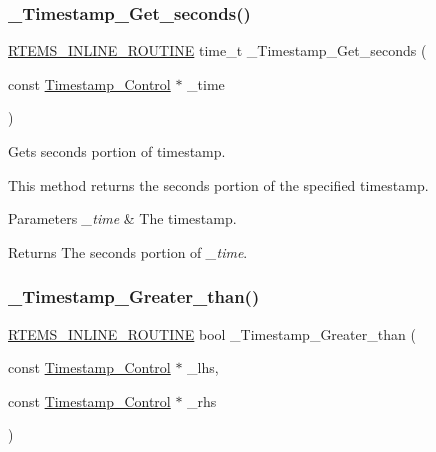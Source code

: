 \subsubsection{\texorpdfstring{\_Timestamp\_Get\_seconds()}{\_Timestamp\_Get\_seconds()}}
{\footnotesize\ttfamily \mbox{\hyperlink{group__RTEMSScoreBaseDefs_gac216239df231d5dbd15e3520b0b9313f}{R\+T\+E\+M\+S\+\_\+\+I\+N\+L\+I\+N\+E\+\_\+\+R\+O\+U\+T\+I\+NE}} time\+\_\+t \+\_\+\+Timestamp\+\_\+\+Get\+\_\+seconds (\begin{DoxyParamCaption}\item[{const \mbox{\hyperlink{group__SuperCoreTimeStamp_ga8508036506d5211c98844c88045e2410}{Timestamp\+\_\+\+Control}} $\ast$}]{\+\_\+time }\end{DoxyParamCaption})}



Gets seconds portion of timestamp. 

This method returns the seconds portion of the specified timestamp.


\begin{DoxyParams}{Parameters}
{\em \+\_\+time} & The timestamp.\\
\hline
\end{DoxyParams}
\begin{DoxyReturn}{Returns}
The seconds portion of {\itshape \+\_\+time}. 
\end{DoxyReturn}
\mbox{\label{group__SuperCoreTimeStamp_ga4c13afe64fbb96455d7dc0ea3b9bd3f9}} 
\subsubsection{\texorpdfstring{\_Timestamp\_Greater\_than()}{\_Timestamp\_Greater\_than()}}
{\footnotesize\ttfamily \mbox{\hyperlink{group__RTEMSScoreBaseDefs_gac216239df231d5dbd15e3520b0b9313f}{R\+T\+E\+M\+S\+\_\+\+I\+N\+L\+I\+N\+E\+\_\+\+R\+O\+U\+T\+I\+NE}} bool \+\_\+\+Timestamp\+\_\+\+Greater\+\_\+than (\begin{DoxyParamCaption}\item[{const \mbox{\hyperlink{group__SuperCoreTimeStamp_ga8508036506d5211c98844c88045e2410}{Timestamp\+\_\+\+Control}} $\ast$}]{\+\_\+lhs,  }\item[{const \mbox{\hyperlink{group__SuperCoreTimeStamp_ga8508036506d5211c98844c88045e2410}{Timestamp\+\_\+\+Control}} $\ast$}]{\+\_\+rhs }\end{DoxyParamCaption})}



